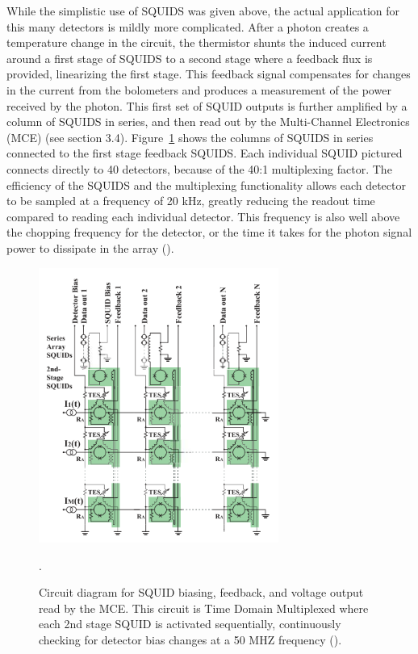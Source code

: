 \documentclass[manuscript]{aastex}
\begin{document}
While the simplistic use of SQUIDS was given above, the actual application for this many detectors is mildly more complicated. After a photon creates a temperature change in the circuit, the thermistor shunts the induced current around a first stage of SQUIDS to a second stage where a feedback flux is provided, linearizing the first stage. This feedback signal compensates for changes in the current from the bolometers and produces a measurement of the power received by the photon. This first set of SQUID outputs is further amplified by a column of SQUIDS in series, and then read out by the Multi-Channel Electronics (MCE) (see section 3.4). Figure~\ref{fig:squids} shows the columns of SQUIDS in series connected to the first stage feedback SQUIDS. Each individual SQUID pictured connects directly to 40 detectors, because of the 40:1 multiplexing factor. The efficiency of the SQUIDS and the multiplexing functionality allows each detector to be sampled at a frequency of 20 kHz, greatly reducing the readout time compared to reading each individual detector. This frequency is also well above the chopping frequency for the detector, or the time it takes for the photon signal power to dissipate in the array (\cite{Dobbs2009}). 

\begin{figure}[H]
\centering
\captionsetup{width=0.7\textwidth}
\includegraphics[width=0.7\textwidth]{squids.PNG}
\caption[Circuit Diagram for TDM SQUIDS -(\cite{Dobbs2009})]{Circuit diagram for SQUID biasing, feedback, and voltage output read by the MCE. This circuit is Time Domain Multiplexed where each 2nd stage SQUID is activated sequentially, continuously checking for detector bias changes at a 50 MHZ frequency (\cite{Dobbs2009}).}. 
\label{fig:squids}
\vspace{-0.8cm}
\end{figure}
\end{document}
